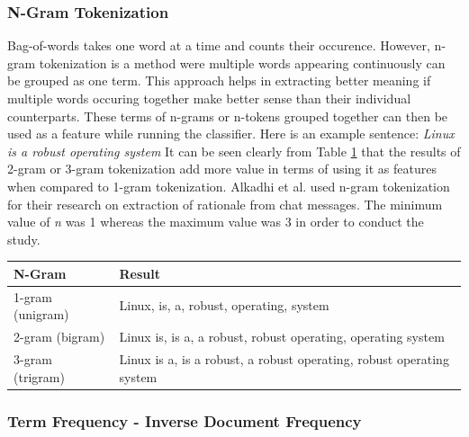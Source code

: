 \documentclass[a4paper,12pt,twoside]{report}
\begin{document}
\subsubsection{N-Gram Tokenization}
Bag-of-words takes one word at a time and counts their occurence. However, n-gram tokenization is a method were multiple words appearing continuously can be grouped as one term. This approach helps in extracting better meaning if multiple words occuring together make better sense than their individual counterparts. These terms of n-grams or n-tokens grouped together can then be used as a feature while running the classifier. 
\newline \newline
Here is an example sentence: \textit{Linux is a robust operating system}
\newline \newline
It can be seen clearly from Table \ref{tab:ngramExample} that the results of 2-gram or 3-gram tokenization add more value in terms of using it as features when compared to 1-gram tokenization. Alkadhi et al.\cite{Alkadhi2017} used n-gram tokenization for their research on extraction of rationale from chat messages. The minimum value of \textit{n} was 1 whereas the maximum value was 3 in order to conduct the study. 
\begin{table} %
    \centering
    \begin{adjustbox}{max width=\columnwidth}
    \def\arraystretch{1} %
    \begin{tabular}{p{4cm} p{10cm}}
        \toprule
        \textbf{N-Gram} & \textbf{Result}\\
        \midrule
			1-gram (unigram) & Linux, is, a, robust, operating, system \\
			2-gram (bigram) & Linux is, is a, a robust, robust operating, operating system \\ 
			3-gram (trigram) & Linux is a, is a robust, a robust operating, robust operating system \\
        \midrule
    \end{tabular}
    \end{adjustbox}
    \label{tab:ngramExample}
\end{table}


\subsubsection{Term Frequency - Inverse Document Frequency}
\end{document}
